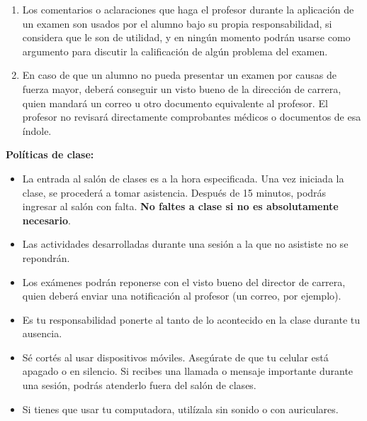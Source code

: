 \documentclass[12pt, letterpaper, oneside]{article}
\begin{document}
\begin{enumerate}
  \item Los comentarios o aclaraciones que haga el profesor durante la aplicación de un examen son usados por el alumno bajo su propia responsabilidad, si considera que le son de utilidad, y en ningún momento podrán usarse como argumento para discutir la calificación de algún problema del examen.
  \item En caso de que un alumno no pueda presentar un examen por causas de fuerza mayor, deberá conseguir un visto bueno de la dirección de carrera, quien mandará un correo u otro documento equivalente al profesor. El profesor no revisará directamente comprobantes médicos o documentos de esa índole.
  \end{enumerate}

  \pagebreak
  
  \noindent\textbf{Políticas de clase:}  
  \begin{itemize}
  \item La entrada al salón de clases es a la hora especificada. Una vez iniciada la clase, se procederá a tomar asistencia. Después de 15 minutos, podrás ingresar al salón con falta. \textbf{No faltes a clase si no es absolutamente necesario}.
  \item Las actividades desarrolladas durante una sesión a la que no asististe no se repondrán.
  \item Los exámenes podrán reponerse con el visto bueno del director de carrera, quien deberá enviar una notificación al profesor (un correo, por ejemplo).
  \item Es tu responsabilidad ponerte al tanto de lo acontecido en la clase durante tu ausencia.
  \item Sé cortés al usar dispositivos móviles. Asegúrate de que tu celular está apagado o en silencio. Si recibes una llamada o mensaje importante durante una sesión, podrás atenderlo fuera del salón de clases.\footnotemark
  \item Si tienes que usar tu computadora, utilízala sin sonido o con auriculares.\footnotemark[\value{footnote}]
  \end{itemize}

\end{document}
